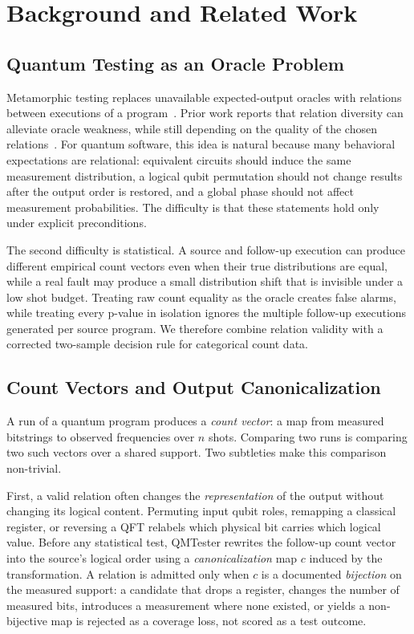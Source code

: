 \section{Background and Related Work}

\subsection{Quantum Testing as an Oracle Problem}

Metamorphic testing replaces unavailable expected-output oracles with relations between executions of a program~\cite{chen1998metamorphic,barr2015oracle,segura2016survey,chen2018metamorphic}. Prior work reports that relation diversity can alleviate oracle weakness, while still depending on the quality of the chosen relations~\cite{liu2014effectively}. For quantum software, this idea is natural because many behavioral expectations are relational: equivalent circuits should induce the same measurement distribution, a logical qubit permutation should not change results after the output order is restored, and a global phase should not affect measurement probabilities. The difficulty is that these statements hold only under explicit preconditions.

The second difficulty is statistical. A source and follow-up execution can produce different empirical count vectors even when their true distributions are equal, while a real fault may produce a small distribution shift that is invisible under a low shot budget. Treating raw count equality as the oracle creates false alarms, while treating every p-value in isolation ignores the multiple follow-up executions generated per source program. We therefore combine relation validity with a corrected two-sample decision rule for categorical count data.

\subsection{Count Vectors and Output Canonicalization}
\label{sec:count-vectors}

A run of a quantum program produces a \emph{count vector}: a map from measured bitstrings to observed frequencies over $n$ shots. Comparing two runs is comparing two such vectors over a shared support. Two subtleties make this comparison non-trivial.

First, a valid relation often changes the \emph{representation} of the output without changing its logical content. Permuting input qubit roles, remapping a classical register, or reversing a QFT relabels which physical bit carries which logical value. Before any statistical test, QMTester rewrites the follow-up count vector into the source's logical order using a \emph{canonicalization} map $c$ induced by the transformation. A relation is admitted only when $c$ is a documented \emph{bijection} on the measured support: a candidate that drops a register, changes the number of measured bits, introduces a measurement where none existed, or yields a non-bijective map is rejected as a coverage loss, not scored as a test outcome.

